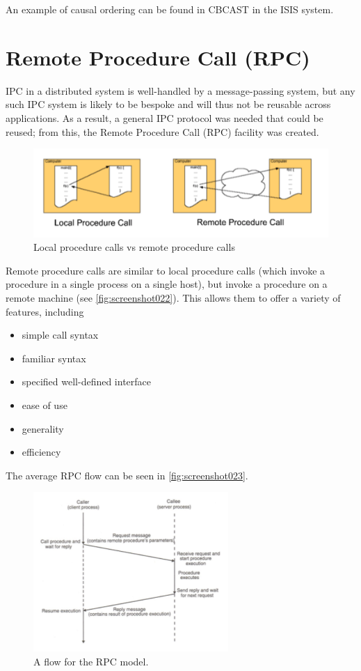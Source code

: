An example of causal ordering can be found in CBCAST in the ISIS system.

\section{Remote Procedure Call (RPC)}
IPC in a distributed system is well-handled by a message-passing system, but any such IPC system is likely to be bespoke and will thus not be reusable across applications. As a result, a general IPC protocol was needed that could be reused; from this, the Remote Procedure Call (RPC) facility was created.

\begin{figure}
\centering
\includegraphics[width=0.7\linewidth]{figures/screenshot022}
\caption{Local procedure calls vs remote procedure calls}
\label{fig:screenshot022}
\end{figure}

Remote procedure calls are similar to local procedure calls (which invoke a procedure in a single process on a single host), but invoke a procedure on a remote machine (see \autoref{fig:screenshot022}). This allows them to offer a variety of features, including \begin{itemize}
\item simple call syntax
\item familiar syntax
\item specified well-defined interface
\item ease of use
\item generality
\item efficiency
\end{itemize}

The average RPC flow can be seen in \autoref{fig:screenshot023}.
\begin{figure}
\centering
\includegraphics[width=0.7\linewidth]{figures/screenshot023}
\caption{A flow for the RPC model.}
\label{fig:screenshot023}
\end{figure}

